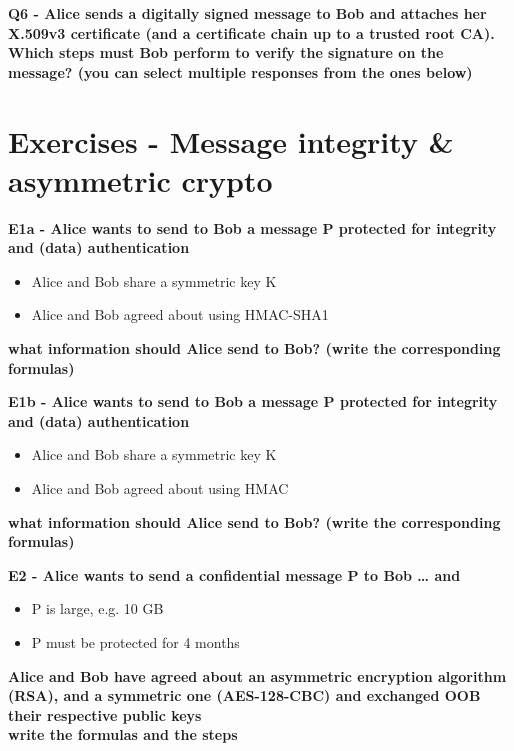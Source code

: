 \textbf{Q6 - Alice sends a digitally signed message to Bob and attaches her X.509v3 certificate (and a certificate chain up to a trusted root CA). Which steps must Bob perform to verify the signature on the message? (you can select multiple responses from the ones below)}

\section*{Exercises - Message integrity & asymmetric crypto}

\textbf{E1a - Alice wants to send to Bob a message P protected for integrity and (data) authentication}
\begin{itemize}
    \item Alice and Bob share a symmetric key K
    \item Alice and Bob agreed about using HMAC-SHA1
\end{itemize}
\textbf{what information should Alice send to Bob? (write the corresponding formulas)\\}

\textbf{E1b - Alice wants to send to Bob a message P protected for integrity and (data) authentication}
\begin{itemize}
    \item Alice and Bob share a symmetric key K
    \item Alice and Bob agreed about using HMAC
\end{itemize}
\textbf{what information should Alice send to Bob? (write the corresponding formulas)\\}

\textbf{E2 - Alice wants to send a confidential message P to Bob … and}
\begin{itemize}
    \item P is large, e.g. 10 GB
    \item P must be protected for 4 months 
\end{itemize}
\textbf{Alice and Bob have agreed about an asymmetric encryption algorithm (RSA), and a symmetric one (AES-128-CBC) and exchanged OOB their respective public keys
\\ write the formulas and the steps\\}

